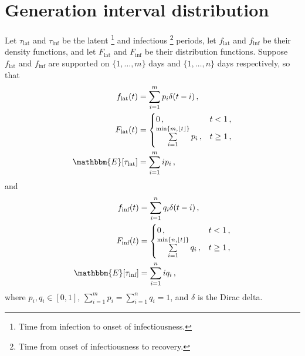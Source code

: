 \documentclass[12pt]{article}
\newcommand{\tlat}{\tau_\text{lat}}
\newcommand{\tinf}{\tau_\text{inf}}
\renewcommand{\flat}{f_\text{lat}}
\newcommand{\finf}{f_\text{inf}}
\newcommand{\Flat}{F_\text{lat}}
\newcommand{\Finf}{F_\text{inf}}
\begin{document}
\setlength{\parskip}{3mm}
\setlength{\parindent}{7mm}

\section{Generation interval distribution}

Let $\tlat$ and $\tinf$ be the latent%
\footnote{Time from infection to onset of infectiousness.}
and infectious%
\footnote{Time from onset of infectiousness to recovery.}
periods, let $\flat$ and $\finf$ be their density functions,
and let $\Flat$ and $\Finf$ be their distribution functions.
Suppose $\flat$ and $\finf$ are supported on $\{1,\ldots,m\}$
days and $\{1,\ldots,n\}$ days respectively, so that
%
\begin{subequations}
  \begin{align}
    \flat(t) &= \sum_{i=1}^{m} p_i \delta(t - i)\,, \label{eq:fX} \\
    \Flat(t) &= \begin{cases} 0\,, & t < 1\,, \\ \sum\limits_{i=1}^{\min\{m,\lfloor t \rfloor\}} p_i\,, & t \geq 1\,, \end{cases} \\ 
    \mathbbm{E}[\tlat] &= \sum_{i=1}^{m} i p_i\,,
  \end{align}
\end{subequations}
%
and
%
\begin{subequations}
  \begin{align}
    \finf(t) &= \sum_{i=1}^{n} q_i \delta(t - i)\,, \\
    \Finf(t) &= \begin{cases} 0\,, & t < 1\,, \\ \sum\limits_{i=1}^{\min\{n,\lfloor t \rfloor\}} q_i\,, & t \geq 1\,, \end{cases} \label{eq:FY} \\
    \mathbbm{E}[\tinf] &= \sum_{i=1}^{n} i q_i\,,
  \end{align}
\end{subequations}
%
where $p_i,q_i \in [0,1]$, $\sum_{i=1}^{m} p_i = \sum_{i=1}^{n} q_i = 1$,
and $\delta$ is the Dirac delta.
\end{document}
